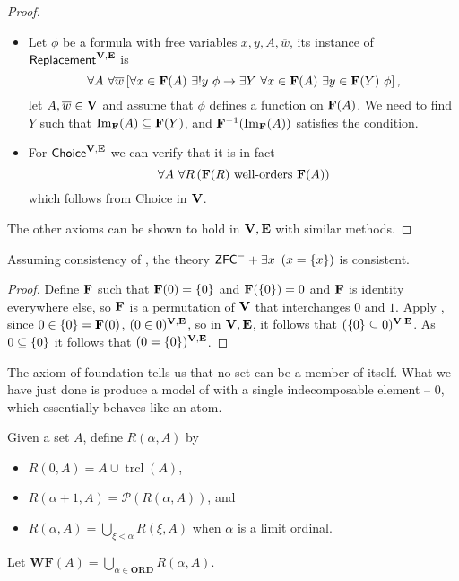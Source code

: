 \begin{proof}
\begin{itemize}
        \item Let \(\phi\) be a formula with free variables \(x,y,A,\overline{w}\), its instance of \(\textsf{Replacement}^{\mathbf{V},\mathbf{E}}\) is
            \[ \forall A~\forall \overline{w} \left[ 
                    \forall x\in\mathbf{F}(A) ~ \exists!y\ \phi \rightarrow \exists Y~ \forall x\in \mathbf{F}(A)~ \exists y\in \mathbf{F}(Y)~ \phi
                 \right],
            \]
            let \(A,\overline{w}\in \mathbf{V}\) and assume that \(\phi\) defines a function on \(\mathbf{F}(A)\).
            We need to find \(Y\) such that \(\operatorname{Im}_{\mathbf{F}}(A) \subseteq \mathbf{F}(Y)\), and \(\mathbf{F}^{-1}(\operatorname{Im}_{\mathbf{F}}(A))\) satisfies the condition.

        \item For \(\textsf{Choice}^{\mathbf{V},\mathbf{E}}\) we can verify that it is in fact
            \[ \forall A~\forall R\left(\mathbf{F}(R) \text{ well-orders } \mathbf{F}(A)\right) \]
            which follows from \textsf{Choice} in \(\mathbf{V}\).
    \end{itemize}
    The other axioms can be shown to hold in \(\mathbf{V},\mathbf{E}\) with similar methods.
\end{proof}

\begin{example}\label{babyAtomExample}
    Assuming consistency of \ZFC, the theory \(\mbox{\normalfont \textsf{ZFC}}^- + \exists x~\left(x = \left\{ x \right\}\right)\) is consistent.
\end{example}
\begin{proof}
    Define \(\mathbf{F}\) such that \(\mathbf{F}(0) = \left\{ 0 \right\}\) and \(\mathbf{F}(\left\{ 0 \right\}) = 0\) and \(\mathbf{F}\) is identity everywhere else,
    so \(\mathbf{F}\) is a permutation of \(\mathbf{V}\) that interchanges \(0\) and \(1\).
    Apply ,
    since \(0 \in \left\{ 0 \right\} = \mathbf{F}(0)\), \((0\in 0)^{\mathbf{V},\mathbf{E}}\),
    so in \(\mathbf{V},\mathbf{E}\), it follows that \((\left\{ 0 \right\} \subseteq 0)^{\mathbf{V},\mathbf{E}}\).
    As \(0 \subseteq \left\{ 0 \right\}\) it follows that \((0 = \left\{ 0 \right\})^{\mathbf{V},\mathbf{E}}\).
\end{proof}

\newcommand{\WF}{\mathbf{WF}}
\newcommand{\trcl}{\operatorname{trcl}}
The axiom of foundation tells us that no set can be a member of itself.
What we have just done is produce a model of \ZFCminus with a single indecomposable element -- \(0\), which essentially behaves like an atom.

\begin{definition}
    Given a set \(A\), define \(R(\alpha,A)\) by
    \begin{itemize}
        \item \(R(0,A) = A \cup \operatorname{trcl}(A)\),
        \item \(R(\alpha+1, A) = \mathcal{P}(R(\alpha, A))\), and
        \item \(R(\alpha, A) = \bigcup_{\xi<\alpha} R(\xi, A)\) when \(\alpha\) is a limit ordinal.
    \end{itemize}
    Let \(\WF(A) = \bigcup_{\alpha\in\mathbf{ORD}} R(\alpha, A)\).
\end{definition}


